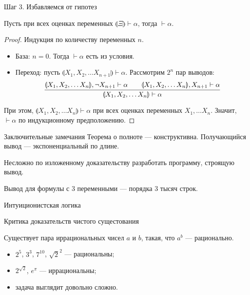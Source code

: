 \documentclass[aspectratio=169]{beamer}
\begin{document}
\begin{frame}{Шаг 3. Избавляемся от гипотез}

\begin{lemmarus}Пусть при всех оценках переменных
$\llparenthesis\Xi\rrparenthesis \vdash \alpha$, тогда
$\vdash\alpha$.
\end{lemmarus}\pause

\begin{proof}
Индукция по количеству переменных $n$.

\begin{itemize}
\item База: $n=0$. Тогда $\vdash\alpha$ есть из условия.\pause
\item Переход: пусть $\llparenthesis X_1, X_2,  \dots X_{n+1} \rrparenthesis \vdash \alpha$.
Рассмотрим $2^n$ пар выводов:
$$\infer
  {\llparenthesis X_1, X_2, \dots X_n \rrparenthesis \vdash \alpha}
  {\llparenthesis X_1, X_2, \dots X_n\rrparenthesis,\neg X_{n+1} \vdash \alpha\quad\quad 
   \llparenthesis X_1, X_2, \dots X_n\rrparenthesis,X_{n+1} \vdash \alpha
}$$
\end{itemize}
При этом, $\llparenthesis X_1, X_2, \dots X_n \rrparenthesis  \vdash \alpha$ при всех оценках
переменных $X_1, \dots X_n$. Значит, $\vdash\alpha$ по индукционному предположению.
\end{proof}

\end{frame}

\begin{frame}{Заключительные замечания}
Теорема о полноте --- конструктивна. Получающийся вывод --- экспоненциальный по длине.

Несложно по изложенному доказательству разработать программу, строящую вывод.

Вывод для формулы с 3 переменными --- порядка 3 тысяч строк.

\end{frame}

\begin{frame}
\LARGE\begin{center}Интуиционистская логика\end{center}
\end{frame}

\begin{frame}{Критика доказательств чистого сущестования}

\begin{thmrus}Существует пара иррациональных чисел $a$ и $b$,
такая, что $a^b$ — рационально.
\end{thmrus}\pause

\begin{itemize}
\item $2^5$, $3^3$, $7^{10}$, $\sqrt{2}^2$ — рациональны;
\item $2^{\sqrt{2}}$, $e ^ \pi$ — иррациональны;
\item задача выглядит довольно сложно.
\end{itemize}
\end{frame}
\end{document}
